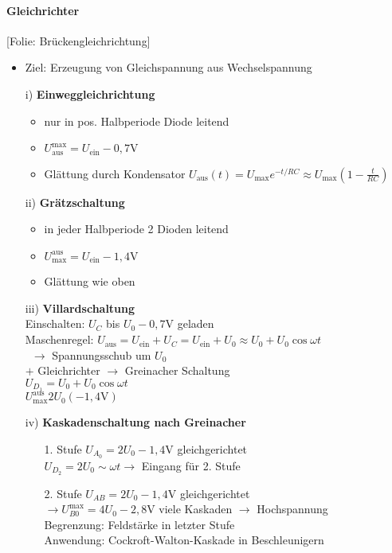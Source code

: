 \documentclass[titlepage,12pt,a4paper,ngerman]{report}
\newcommand{\tx}[1]{\textrm{#1}}
\newcommand{\folie}[1]{\color{gray}[Folie: #1]\color{black}}
\begin{document}
\paragraph{Gleichrichter}
\begin{trivlist}
	\item \folie{Brückengleichrichtung}
\end{trivlist}
\begin{itemize}
	\item Ziel: Erzeugung von Gleichspannung aus Wechselspannung
	\item[i)] \textbf{Einweggleichrichtung}
	\begin{itemize}
		\item nur in pos. Halbperiode Diode leitend
		\item $ U_{\tx{aus}}^{\tx{max}} = U_{\tx{ein}} - 0,7 \tx{V} $
		\item Glättung durch Kondensator $ U_{\tx{aus}}(t) = U_{\tx{max}} e^{-t/RC} \approx U_{\tx{max}} (1- \frac{t}{RC}) $
	\end{itemize}
	\item[ii)] \textbf{Grätzschaltung}
	\begin{itemize}
		\item in jeder Halbperiode 2 Dioden leitend
		\item $ U_{\tx{max}}^{\tx{aus}} = U_{\tx{ein}} - 1,4 \tx{V} $
		\item Glättung wie oben
	\end{itemize}
	\item [iii)] \textbf{Villardschaltung}\\
	Einschalten: $ U_C $ bis $ U_0 -0,7 \tx{V} $ geladen\\
	Maschenregel: $ U_{\tx{aus}} = U_{\tx{ein}} + U_C = U_{\tx{ein}} + U_0 \approx U_0 + U_0 \cos \omega t $\\\
	$ \rightarrow $ Spannungsschub um $ U_0 $\\
	$ + $ Gleichrichter $ \rightarrow $ Greinacher Schaltung\\
	$ U_{D_1} = U_0 + U_0 \cos \omega t $\\
	$ U_{\tx{max}}^{\tx{aus}} 2 U_0 (-1,4 \tx{V}) $
	\item[iv)] \textbf{Kaskadenschaltung nach Greinacher}
	\begin{itemize}
		\item[1. Stufe]
		$ U_{A_0} = 2 U_0 -1,4\tx{V} $ gleichgerichtet\\
		$ U_{D_2} = 2 U_0 \sim \omega t \rightarrow $ Eingang für 2. Stufe
		\item [2. Stufe]
		$ U_{AB} = 2 U_0 - 1,4 \tx{V} $ gleichgerichtet\\
		$ \rightarrow U_{B0}^{\tx{max}} = 4 U_0 - 2,8 \tx{V} $
		viele Kaskaden $ \rightarrow $ Hochspannung\\
		Begrenzung: Feldstärke in letzter Stufe\\
		Anwendung: Cockroft-Walton-Kaskade in Beschleunigern
	\end{itemize}
\end{itemize}
\end{document}
